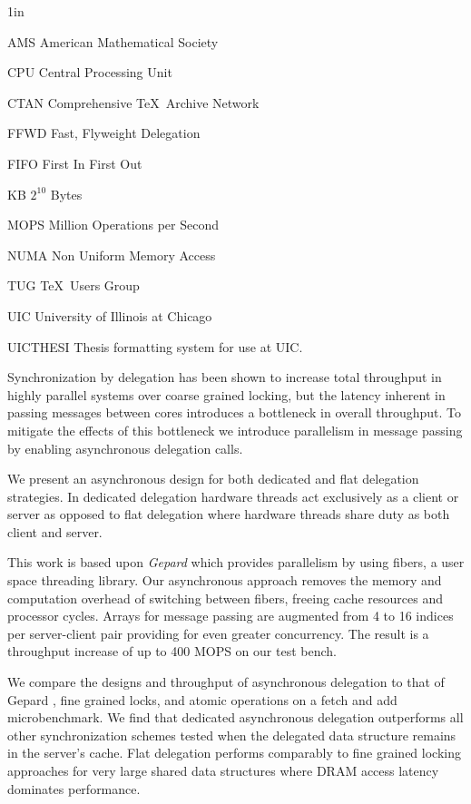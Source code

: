 \documentclass{uicthesi}
\begin{document}
\tableofcontents
\listoftables
\listoffigures
\listofabbreviations
\begin{list}
{}
{\setlength
  {}{1in}
    \setlength{\leftmargin}{1.5in}
    \setlength{\labelsep}{.5in}
    \setlength{\rightmargin}{\leftmargin}}
\item[AMS\hfill] American Mathematical Society
\item[CPU\hfill] Central Processing Unit
\item[CTAN\hfill] Comprehensive \TeX\ Archive Network
\item[FFWD\hfill] Fast, Flyweight Delegation
\item[FIFO\hfill] First In First Out
\item[KB\hfill]  $2^{10}$ Bytes
\item[MOPS\hfill] Million Operations per Second
\item[NUMA\hfill] Non Uniform Memory Access
\item[TUG\hfill] \TeX\ Users Group
\item[UIC\hfill] University of Illinois at Chicago
\item[UICTHESI\hfill] Thesis formatting system for use at UIC.
\end{list}
 
\summary
Synchronization by delegation has been shown to increase total throughput in highly parallel systems over coarse grained locking, \cite{ffwd} but the latency inherent in passing messages between cores introduces a bottleneck in overall throughput. To mitigate the effects of this bottleneck we introduce parallelism in message passing by enabling asynchronous delegation calls. 

We present an asynchronous design for both dedicated and flat delegation strategies. In dedicated delegation hardware threads act exclusively as a client or server as opposed to flat delegation where hardware threads share duty as both client and server. 

This work is based upon \textit{Gepard} which provides parallelism by using fibers, a user space threading library. Our asynchronous approach removes the memory and computation overhead of switching between fibers, freeing cache resources and processor cycles. Arrays for message passing are augmented from 4 to 16 indices per server-client pair providing for even greater concurrency. The result is a throughput increase of up to 400 MOPS on our test bench.  

We compare the designs and throughput of asynchronous delegation to that of Gepard \cite{gepard}, fine grained locks, and atomic operations on a fetch and add microbenchmark. We find that dedicated asynchronous delegation outperforms all other synchronization schemes tested when the delegated data structure remains in the server's cache. Flat delegation performs comparably to fine grained locking approaches for very large shared data structures where DRAM access latency dominates performance. 
\end{document}
